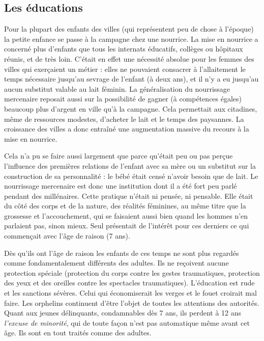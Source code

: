 \subsection{Les éducations}

 Pour la plupart des enfants des villes (qui représentent peu de chose à l'époque) la petite enfance se passe à la campagne chez une nourrice. La mise en nourrice a concerné plus d'enfants que tous les internats éducatifs, collèges ou hôpitaux réunis, et de très loin. C'était en effet une nécessité absolue pour les femmes des villes qui exerçaient un métier : elles ne pouvaient consacrer à l'allaitement le temps nécessaire jusqu'au sevrage de l'enfant (à deux ans), et il n'y a eu jusqu'au  aucun substitut valable au lait féminin. La généralisation du nourrissage mercenaire reposait aussi sur la possibilité de gagner (à compétences égales) beaucoup plus d'argent en ville qu'à la campagne. Cela permettait aux citadines, même de ressources modestes, d'acheter le lait et le temps des paysannes. La croissance des villes a donc entraîné une augmentation massive du recours à la mise en nourrice.

 Cela n'a pu se faire aussi largement que parce qu'était peu ou pas perçue l'influence des premières relations de l'enfant avec sa mère ou un substitut sur la construction de sa personnalité : le bébé était censé n'avoir besoin que de lait. Le nourrissage mercenaire est donc une institution dont il a été fort peu parlé pendant des millénaires. Cette pratique n'était ni pensée, ni pensable. Elle était du côté des corps et de la nature, des réalités féminines, au même titre que la grossesse et l'accouchement, qui se faisaient aussi bien quand les hommes n'en parlaient pas, sinon mieux. Seul présentait de l'intérêt pour ces derniers ce qui commençait avec l'âge de raison (7 ans).

 Dès qu'ils ont l'âge de raison les enfants de ces temps ne sont plus regardés comme fondamentalement différents des adultes. Ils ne reçoivent aucune protection spéciale (protection du corps contre les gestes traumatiques, protection des yeux et des oreilles contre les spectacles traumatiques). L'éducation est rude et les sanctions sévères. Celui qui économiserait les verges et le fouet croirait mal faire. Les orphelins continuent d'être l'objet de toutes les attentions des autorités. Quant aux jeunes délinquants, condamnables dès 7 ans, ils perdent à 12 ans \emph{l'excuse de minorité}, qui de toute façon n'est pas automatique même avant cet âge. Ils sont en tout traités comme des adultes.


